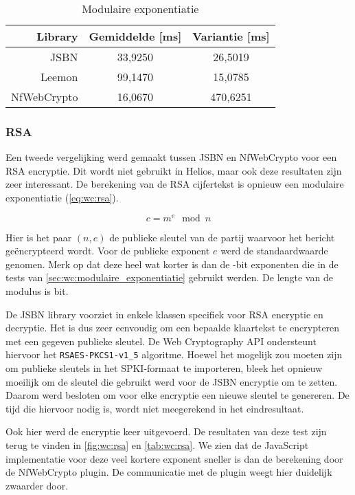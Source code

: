 \begin{table}
  \begin{center}
    \caption{Modulaire exponentiatie}
    \label{tab:wc:modular_exponentiation}
    \begin{tabular}{r | c c}
      Library & Gemiddelde [ms] & Variantie [ms] \\ \hline
      JSBN & 33,9250 & 26,5019  \\
      Leemon & 99,1470 & 15,0785 \\
      NfWebCrypto & 16,0670 & 470,6251
    \end{tabular}
  \end{center}
\end{table}

\subsubsection{RSA}

Een tweede vergelijking werd gemaakt tussen JSBN en NfWebCrypto voor een RSA encryptie. Dit wordt niet gebruikt in Helios, maar ook deze resultaten zijn zeer interessant. De berekening van de RSA cijfertekst is opnieuw een modulaire exponentiatie (\ref{eq:wc:rsa}).\cite{rivest_shamir_adleman_rsa}

\begin{equation}
  \label{eq:wc:rsa}
  c = m^e \mod{n}
\end{equation}

\npar Hier is het paar $(n, e)$ de publieke sleutel van de partij waarvoor het bericht ge\"encrypteerd wordt. Voor de publieke exponent $e$ werd de standaardwaarde  genomen. Merk op dat deze heel wat korter is dan de -bit exponenten die in de tests van \ref{sec:wc:modulaire_exponentiatie} gebruikt werden. De lengte van de modulus is  bit.

\npar De JSBN library voorziet in enkele klassen specifiek voor RSA encryptie en decryptie. Het is dus zeer eenvoudig om een bepaalde klaartekst te encrypteren met een gegeven publieke sleutel. De Web Cryptography API ondersteunt hiervoor het \texttt{RSAES-PKCS1-v1\_5} algoritme.\cite{rfc3447} Hoewel het mogelijk zou moeten zijn om publieke sleutels in het SPKI-formaat te importeren, bleek het opnieuw moeilijk om de sleutel die gebruikt werd voor de JSBN encryptie om te zetten. Daarom werd besloten om voor elke encryptie een nieuwe sleutel te genereren. De tijd die hiervoor nodig is, wordt niet meegerekend in het eindresultaat.

\npar Ook hier werd de encryptie  keer uitgevoerd. De resultaten van deze test zijn terug te vinden in \ref{fig:wc:rsa} en \ref{tab:wc:rsa}. We zien dat de JavaScript implementatie voor deze veel kortere exponent sneller is dan de berekening door de NfWebCrypto plugin. De communicatie met de plugin weegt hier duidelijk zwaarder door.

